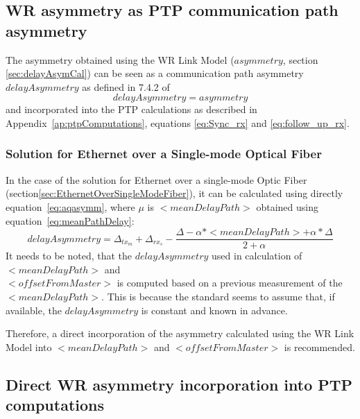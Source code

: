 \documentclass[a4paper, 12pt]{article}
\begin{document}
\subsection{WR asymmetry as PTP communication path asymmetry}

The asymmetry obtained using the WR Link Model ($asymmetry$, section \ref{sec:delayAsymCal}) 
can be seen as a communication path asymmetry $delayAsymmetry$ as defined in 7.4.2 
of \cite{IEEE1588}
\begin{equation}
\label{eq:ptpAsym}
  delayAsymmetry= asymmetry
\end{equation}
and incorporated into the PTP calculations as described in Appendix~\ref{ap:ptpComputations}, 
equations \eqref{eq:Sync_rx} and \eqref{eq:follow_up_rx}.

\subsubsection{Solution for Ethernet over a Single-mode Optical Fiber}

In the case of the solution for Ethernet over a single-mode Optic Fiber 
(section\ref{sec:EthernetOverSingleModeFiber}), it can be calculated using directly 
equation~\eqref{eq:aqasymm}, where $\mu$ is $<meanDelayPath>$ obtained using 
equation~\eqref{eq:meanPathDelay}:
\begin{equation}
\label{eq:delayAsymmetry}
  delayAsymmetry= \Delta_{tx_m} + \Delta_{rx_s} - \frac{\Delta - \alpha * <meanDelayPath> 
			  + \alpha * \Delta}{2 + \alpha}
\end{equation}
It needs to be noted, that the $delayAsymmetry$ used in calculation of $<meanDelayPath>$ and\\
$<offsetFromMaster>$ is computed based on a previous measurement of the \\$<meanDelayPath>$. 
This is because the standard \cite{IEEE1588} seems to assume that, if available, the 
$delayAsymmetry$ is constant and known in advance.

Therefore, a direct incorporation of the asymmetry calculated using the WR Link Model into 
$<meanDelayPath>$ and $<offsetFromMaster>$ is recommended.

\subsection{Direct WR asymmetry incorporation into PTP computations}
\end{document}
